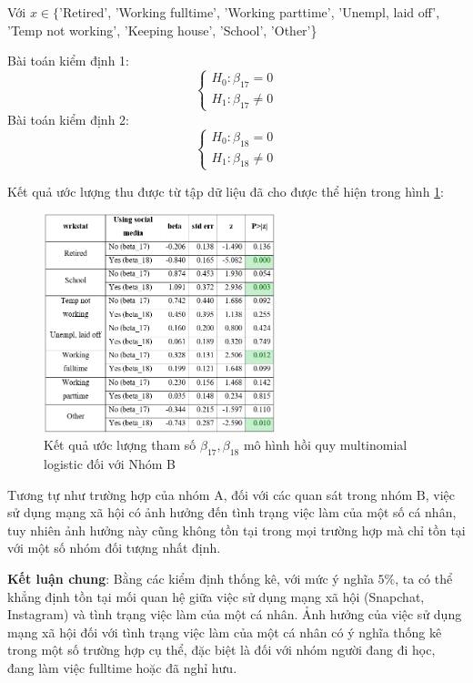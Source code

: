 Với $x \in\{$'Retired', 'Working fulltime', 'Working parttime', 'Unempl, laid off', 'Temp not working', 'Keeping house', 'School', 'Other'\}

Bài toán kiểm định 1:
$$
\left\{\begin{array}{l}
H_{0}: \beta_{17}=0 \\
H_{1}: \beta_{17} \neq 0
\end{array}\right.
$$
Bài toán kiểm định 2:
$$
\left\{\begin{array}{l}
H_{0}: \beta_{18}=0 \\
H_{1}: \beta_{18} \neq 0
\end{array}\right.
$$

Kết quả ước lượng thu được từ tập dữ liệu đã cho được thể hiện trong hình \ref{fig:beta1718}:

\begin{figure}[H]
    \centering
    \includegraphics[width=0.6\textwidth]{figures/beta1718.png}
    \caption{Kết quả ước lượng tham số $\beta_{17}, \beta_{18}$ mô hình hồi quy multinomial logistic đối với Nhóm B}
    \label{fig:beta1718}
\end{figure}

Tương tự như trường hợp của nhóm $\mathrm{A}$, đối với các quan sát trong nhóm $\mathrm{B}$, việc sử dụng mạng xã hội có ảnh hưởng đến tình trạng việc làm của một số cá nhân, tuy nhiên ảnh hưởng này cũng không tồn tại trong mọi trường hợp mà chỉ tồn tại với một số nhóm đối tượng nhất định.


\textbf{Kết luận chung}: Bằng các kiểm định thống kê, với mức ý nghĩa $5 \%$, ta có thể khẳng định tồn tại mối quan hệ giữa việc sử dụng mạng xã hội (Snapchat, Instagram) và tình trạng việc làm của một cá nhân. Ảnh hưởng của việc sử dụng mạng xã hội đối với tình trạng việc làm của một cá nhân có ý nghĩa thống kê trong một số trường hợp cụ thể, đặc biệt là đối với nhóm người đang đi học, đang làm việc fulltime hoặc đã nghỉ hưu.